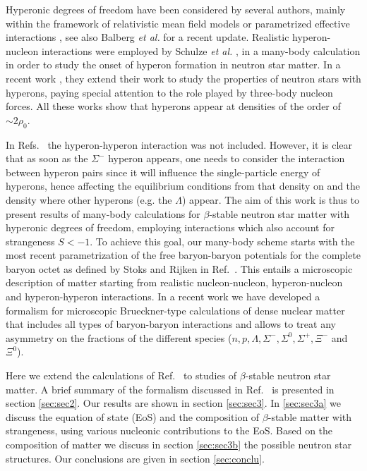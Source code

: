 Hyperonic degrees of freedom have been considered by several authors,
mainly within the framework of relativistic
mean field models \cite{prakash97,pke95,ms96} or parametrized
effective interactions \cite{bg97}, 
see also Balberg {\em et al.} \cite{blc99}
for a recent update. Realistic hyperon-nucleon interactions
were employed by Schulze {\em et al.} \cite{bbs98},
in a many-body calculation in order to study
the onset of hyperon formation in neutron star matter. In a recent
work \cite{bbs00}, they extend their work to study the properties
of neutron stars with hyperons, paying special attention to the
role played by three-body nucleon forces. 
All these works show that hyperons appear at densities of the order of
$\sim 2\rho_0$.

In Refs.~\cite{bbs98,bbs00} the hyperon-hyperon interaction was not 
included. However, it is clear that
as soon as the $\Sigma^-$ hyperon appears, one needs to consider the 
interaction between hyperon pairs
since  
it will influence the single-particle energy of hyperons, hence affecting
the equilibrium conditions from that density on and the density
where other hyperons (e.g. the $\Lambda$) appear. 
The aim of this work is thus 
to present results of 
many-body calculations for $\beta$-stable neutron star matter
with hyperonic degrees of freedom,
employing interactions
which also account for strangeness $S < -1$.
To achieve this goal,
our many-body scheme starts with the most recent
parametrization
of the free baryon-baryon potentials
for the complete  baryon octet
as defined by Stoks and Rijken in Ref.\
\cite{sr99}. 
This entails a microscopic
description of matter starting from
realistic nucleon-nucleon, hyperon-nucleon
and hyperon-hyperon interactions.
In a recent work \cite{isaac99}
we have developed a formalism for microscopic
Brueckner-type calculations of dense nuclear
matter that includes all types of
baryon-baryon interactions and allows to treat
any asymmetry on the fractions of the
different species ($n, p, \Lambda, \Sigma^-, \Sigma^0, \Sigma^+,
\Xi^-$ and $\Xi^0$). 


Here we extend the calculations of Ref.\ \cite{isaac99}
to studies of $\beta$-stable neutron star matter.
A brief summary of the formalism
discussed in Ref.\ \cite{isaac99} is presented  
in section \ref{sec:sec2}. 
Our results are shown in section \ref{sec:sec3}. In
\ref{sec:sec3a} we discuss the
equation of state (EoS) and the composition of $\beta$-stable matter with
strangeness, using various nucleonic contributions to the EoS. 
Based on the composition of
matter we discuss in section \ref{sec:sec3b} the
possible neutron star structures. Our conclusions are given
in section \ref{sec:conclu}.


